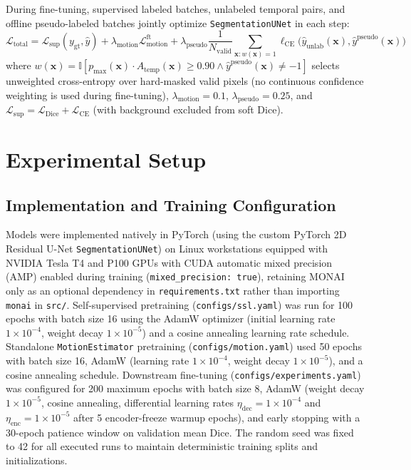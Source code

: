 \documentclass[pdflatex,sn-mathphys]{sn-jnl}
\theoremstyle{thmstyleone}
\theoremstyle{thmstyletwo}
\theoremstyle{thmstylethree}
\begin{document}
During fine-tuning, supervised labeled batches, unlabeled temporal pairs, and offline pseudo-labeled batches jointly optimize \texttt{SegmentationUNet} in each step:
\begin{equation}
\mathcal{L}_{\text{total}} = \mathcal{L}_{\text{sup}}(y_{\text{gt}}, \hat{y}) + \lambda_{\text{motion}} \mathcal{L}_{\text{motion}}^{\text{ft}} + \lambda_{\text{pseudo}} \frac{1}{N_{\text{valid}}} \sum_{\mathbf{x}: w(\mathbf{x})=1} \ell_{\text{CE}}\bigl(\hat{y}_{\text{unlab}}(\mathbf{x}), \hat{y}^{\text{pseudo}}(\mathbf{x})\bigr)
\label{eq:final_loss}
\end{equation}
where $w(\mathbf{x}) = \mathbb{I}[p_{\max}(\mathbf{x}) \cdot A_{\text{temp}}(\mathbf{x}) \ge 0.90 \land \hat{y}^{\text{pseudo}}(\mathbf{x}) \neq -1]$ selects unweighted cross-entropy over hard-masked valid pixels (no continuous confidence weighting is used during fine-tuning), $\lambda_{\text{motion}} = 0.1$, $\lambda_{\text{pseudo}} = 0.25$, and $\mathcal{L}_{\text{sup}} = \mathcal{L}_{\text{Dice}} + \mathcal{L}_{\text{CE}}$ (with background excluded from soft Dice).

\section{Experimental Setup}\label{sec:setup}

\subsection{Implementation and Training Configuration}
Models were implemented natively in PyTorch (using the custom PyTorch 2D Residual U-Net \texttt{SegmentationUNet}) on Linux workstations equipped with NVIDIA Tesla T4 and P100 GPUs with CUDA automatic mixed precision (AMP) enabled during training (\texttt{mixed\_precision: true}), retaining MONAI~\cite{cardoso2022monai} only as an optional dependency in \texttt{requirements.txt} rather than importing \texttt{monai} in \texttt{src/}. Self-supervised pretraining (\texttt{configs/ssl.yaml}) was run for 100 epochs with batch size 16 using the AdamW optimizer (initial learning rate $1\times 10^{-4}$, weight decay $1\times 10^{-5}$) and a cosine annealing learning rate schedule. Standalone \texttt{MotionEstimator} pretraining (\texttt{configs/motion.yaml}) used 50 epochs with batch size 16, AdamW (learning rate $1\times 10^{-4}$, weight decay $1\times 10^{-5}$), and a cosine annealing schedule. Downstream fine-tuning (\texttt{configs/experiments.yaml}) was configured for 200 maximum epochs with batch size 8, AdamW (weight decay $1\times 10^{-5}$, cosine annealing, differential learning rates $\eta_{\text{dec}} = 1\times 10^{-4}$ and $\eta_{\text{enc}} = 1\times 10^{-5}$ after 5 encoder-freeze warmup epochs), and early stopping with a 30-epoch patience window on validation mean Dice. The random seed was fixed to 42 for all executed runs to maintain deterministic training splits and initializations.
\end{document}

